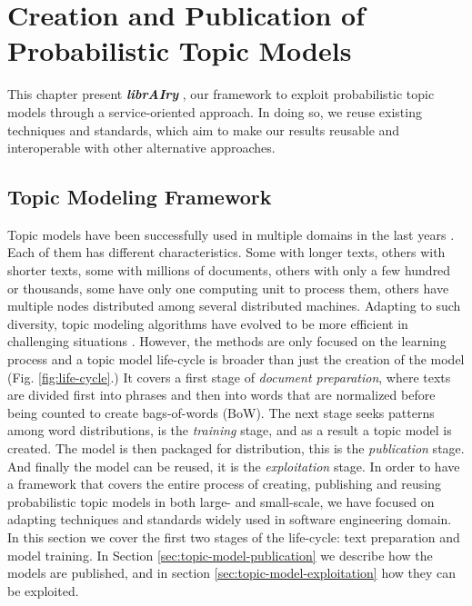 

\chapter{Creation and Publication of Probabilistic Topic Models}\label{ch:scalability}

\graphicspath{{scalability/figures/}}


This chapter present \textit{\textbf{librAIry}} \citep{Badenes-Olmedo2017}, our framework to exploit probabilistic topic models through a service-oriented approach. In doing so, we reuse existing techniques and standards, which aim to make our results reusable and interoperable with other alternative approaches.


\section{Topic Modeling Framework}
\label{sec:topic-model-framework}


Topic models have been successfully used in multiple domains in the last years \citep{TapiNzali2017, ONeill2017, Greene2016, He2017}. Each of them has different characteristics. Some with longer texts, others with shorter texts, some with millions of documents, others with only a few hundred or thousands, some have only one computing unit to process them, others have multiple nodes distributed among several distributed machines. Adapting to such diversity, topic modeling algorithms have evolved to be more efficient in challenging situations \citep{10.1145/2736277.2741106}. However, the methods are only focused on the learning process and a topic model life-cycle is broader than just the creation of the model (Fig. \ref{fig:life-cycle}.) It covers a first stage of \textit{document preparation}, where texts are divided first into phrases and then into words that are normalized before being counted to create bags-of-words (BoW). The next stage seeks patterns among word distributions, is the \textit{training} stage, and as a result a topic model is created. The model is then packaged for distribution, this is the \textit{publication} stage. And finally the model can be reused, it is the \textit{exploitation} stage. In order to have a framework that covers the entire process of creating, publishing and reusing probabilistic topic models in both large- and small-scale, we have focused on adapting techniques and standards widely used in software engineering domain. In this section we cover the first two stages of the life-cycle: text preparation and model training. In Section \ref{sec:topic-model-publication} we describe how the models are published, and in section \ref{sec:topic-model-exploitation} how they can be exploited. 

